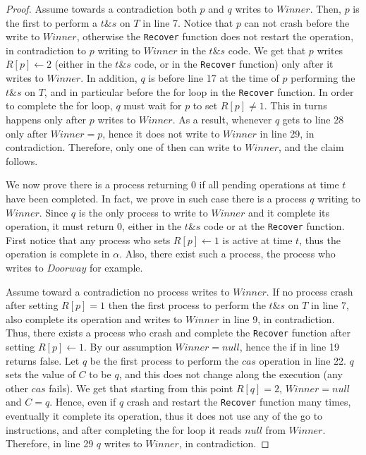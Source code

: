 \begin{proof}
	Assume towards a contradiction both $p$ and $q$ writes to $Winner$. Then, $p$ is the first to perform a $t\&s$ on $T$ in line 7.
	Notice that $p$ can not crash before the write to $Winner$, otherwise the \texttt{Recover} function does not restart the operation, in contradiction to $p$ writing to $Winner$ in the $t\&s$ code. We get that $p$ writes $R[p] \gets 2$ (either in the $t\&s$ code, or in the \texttt{Recover} function) only after it writes to $Winner$.
	In addition, $q$ is before line 17 at the time of $p$ performing the $t\&s$ on $T$, and in particular before the for loop in the \texttt{Recover} function. In order to complete the for loop, $q$ must wait for $p$ to set $R[p] \neq 1$. This in turns happens only after $p$ writes to $Winner$. As a result, whenever $q$ gets to line 28 only after $Winner = p$, hence it does not write to $Winner$ in line 29, in contradiction. Therefore, only one of then can write to $Winner$, and the claim follows.
	

	We now prove there is a process returning 0 if all pending operations at time $t$ have been completed. In fact, we prove in such case there is a process $q$ writing to $Winner$. Since $q$ is the only process to write to $Winner$ and it complete its operation, it must return 0, either in the $t\&s$ code or at the \texttt{Recover} function.
	First notice that any process who sets $R[p] \gets 1$ is active at time $t$, thus the operation is complete in $\alpha$. Also, there exist such a process, the process who writes to $Doorway$ for example.
	
	Assume toward a contradiction no process writes to $Winner$. If no process crash after setting $R[p] = 1$ then the first process to perform the $t\&s$ on $T$ in line 7, also complete its operation and writes to $Winner$ in line 9, in contradiction. Thus, there exists a process who crash and complete the \texttt{Recover} function after setting $R[p] \gets 1$. By our assumption $Winner = null$, hence the if in line 19 returns false. Let $q$ be the first process to perform the $cas$ operation in line 22. $q$ sets the value of $C$ to be $q$, and this does not change along the execution (any other $cas$ fails). We get that starting from this point $R[q] = 2$, $Winner = null$ and $C = q$. Hence, even if $q$ crash and restart the \texttt{Recover} function many times, eventually it complete its operation, thus it does not use any of the go to instructions, and after completing the for loop it reads $null$ from $Winner$. Therefore, in line 29 $q$ writes to $Winner$, in contradiction.
	

\end{proof}